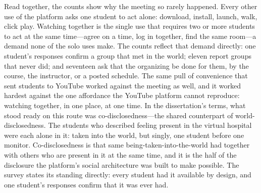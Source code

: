Read together, the counts show why the meeting so rarely happened.
Every other use of the platform asks one student to act alone:
download, install, launch, walk, click play. Watching together is the
single use that requires two or more students to act at the same
time---agree on a time, log in together, find the same room---a demand
none of the solo uses make. The counts reflect that demand directly:
one student's responses confirm a group that met in the world; eleven
report groups that never did; and seventeen ask that the organizing be
done for them, by the course, the instructor, or a posted schedule. The
same pull of convenience that sent students to YouTube worked against
the meeting as well, and it worked hardest against the one affordance
the YouTube platform cannot reproduce: watching together, in one place,
at one time. In the dissertation's terms, what stood ready on this
route was co-disclosedness---the shared counterpart of
world-disclosedness. The students who described feeling present in the
virtual hospital were each alone in it: taken into the world, but
singly, one student before one monitor.
Co-disclosedness is that same being-taken-into-the-world had together
with others who are present in it at the same time, and it is the half
of the disclosure the platform's social architecture was built to make
possible. The survey states its standing directly: every student had it
available by design, and one student's responses confirm that it was
ever had.

